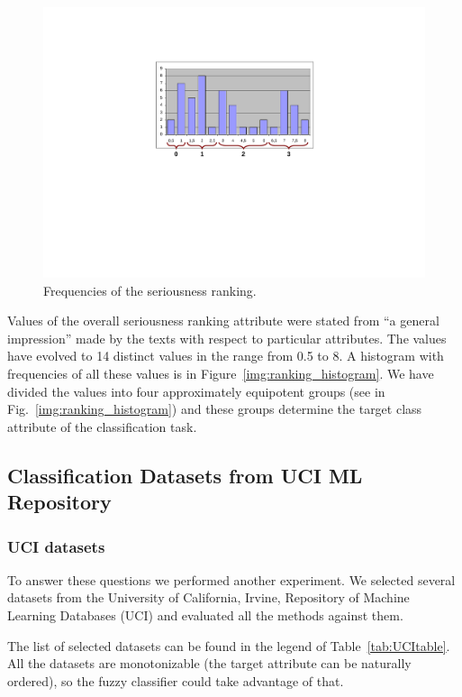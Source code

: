 \begin{figure}
\centerline{\includegraphics[angle=-90, width=0.6\hsize]{ranking_histogram}}
\caption{Frequencies of the seriousness ranking.}
\label{img:ch40_ranking_histogram}
\end{figure}

Values of the overall seriousness ranking attribute were stated from ``a general impression'' made by the texts with respect to particular attributes. %
The values have evolved to 14 distinct values in the range from 0.5 to 8. 
A histogram with frequencies of all these values is in Figure~\ref{img:ranking_histogram}.
We have divided the values into four approximately equipotent groups 
(see in Fig.~\ref{img:ranking_histogram}) 
and these groups determine the target class attribute of the classification task. 






\subsection{Classification Datasets from UCI ML Repository} \label{sec:ch40_uci_datasets}
\subsubsection{UCI datasets}

To answer these questions we performed another experiment. We selected several datasets from the University of California, Irvine, Repository of Machine Learning Databases (UCI) \citep{dedek:UCI} and evaluated all the methods against them. 



The list of selected datasets can be found in the legend of Table~\ref{tab:UCItable}. All the datasets are monotonizable (the target attribute can be naturally ordered), so the fuzzy classifier could take advantage of that.


